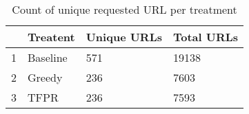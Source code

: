 \begin{table}[ht]
\centering
\begin{tabular}{rlll}
  \hline
 & Treatent & Unique URLs & Total URLs \\ 
  \hline
1 & Baseline & 571 & 19138 \\ 
  2 & Greedy & 236 & 7603 \\ 
  3 & TFPR & 236 & 7593 \\ 
   \hline
\end{tabular}
\caption{Count of unique requested URL per treatment} 
\label{tab:results:rq2:summary:treatment:url}
\end{table}
